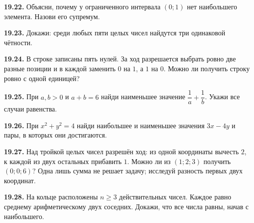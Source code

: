 \noindent\begin{minipage}[t]{\linewidth}\textbf{19.22.} Объясни, почему у ограниченного интервала \((0;1)\) нет наибольшего элемента. Назови его супремум.\par\end{minipage}\par
\noindent\begin{minipage}[t]{\linewidth}\textbf{19.23.} Докажи: среди любых пяти целых чисел найдутся три одинаковой чётности.\par\end{minipage}\par
\noindent\begin{minipage}[t]{\linewidth}\textbf{19.24.} В строке записаны пять нулей. За ход разрешается выбрать ровно две разные позиции и в каждой заменить \(0\) на \(1\), а \(1\) на \(0\). Можно ли получить строку ровно с одной единицей?\par\end{minipage}\par
\noindent\begin{minipage}[t]{\linewidth}\textbf{19.25.}\starmark{} При \(a,b>0\) и \(a+b=6\) найди наименьшее значение \(\dfrac1a+\dfrac1b\). Укажи все случаи равенства.\par\end{minipage}\par
\noindent\begin{minipage}[t]{\linewidth}\textbf{19.26.}\starmark{} При \(x^2+y^2=4\) найди наибольшее и наименьшее значения \(3x-4y\) и пары, в которых они достигаются.\par\end{minipage}\par
\noindent\begin{minipage}[t]{\linewidth}\textbf{19.27.}\starmark{} Над тройкой целых чисел разрешён ход: из одной координаты вычесть \(2\), к каждой из двух остальных прибавить \(1\). Можно ли из \((1;2;3)\) получить \((0;0;6)\)? Одна лишь сумма не решает задачу; исследуй разность первых двух координат.\par\end{minipage}\par
\noindent\begin{minipage}[t]{\linewidth}\textbf{19.28.}\starmark{} На кольце расположены \(n\ge3\) действительных чисел. Каждое равно среднему арифметическому двух соседних. Докажи, что все числа равны, начав с наибольшего.\par\end{minipage}\par
